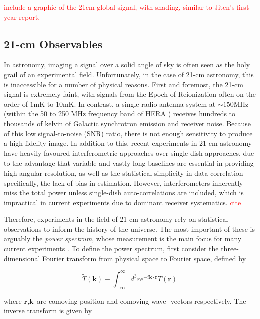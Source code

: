 \documentclass[floats,floatfix,showpacs,amssymb,prd,superscriptaddress,nofootinbib]{revtex4-2} %
\newcommand{\red}{\textcolor{red}}
\begin{document}
\red{include a graphic of the 21cm global signal, with shading, similar to Jiten's first year report.}

\subsection{21-cm Observables}

In astronomy, imaging a signal over a solid angle of sky is often seen as the holy grail of an experimental field. Unfortunately, in the case of 21-cm astronomy, this is inaccessible for a number of physical reasons. First and foremost, the 21-cm signal is extremely faint, with signals from the Epoch of Reionization often on the order of $1 \text{mK}$ to $10 \text{mK}$.
In contrast, a single radio-antenna system at  $\sim 150 \text{MHz}$ (within the 50 to 250 MHz frequency band of HERA \citep{DeBoer_2017}) receives hundreds to thousands of kelvin of Galactic synchrotron emission and receiver noise. Because of this low signal-to-noise (SNR) ratio, there is not enough sensitivity to produce a high-fidelity image. In addition to this, recent experiments in 21-cm astronomy have heavily favoured interferometric approaches over single-dish approaches, due to the advantage that variable and vastly long baselines are essential in providing high angular resolution, as well as the statistical simplicity in data correlation -- specifically, the lack of bias in estimation. However, interferometers inherently miss the total power unless single-dish auto-correlations are included, which is impractical in current experiments due to dominant receiver systematics. \red{cite}

Therefore, experiments in the field of 21-cm astronomy rely on statistical observations to inform the history of the universe. The most important of these is arguably the \textit{power spectrum}, whose measurement is the main focus for many current experiments \citep{DeBoer_2017}. To define the power spectrum, first consider the three-dimensional Fourier transform from physical space to Fourier space, defined by

\begin{equation}
    \tilde{T} (\textbf{k}) \equiv \int^\infty _{-\infty} d^3 r e^{-i\textbf{k} \cdot \textbf{r}} T(\textbf{r})
\end{equation}

\noindent where $\textbf{r}, \textbf{k}$ are comoving position and comoving wave- vectors respectively. The inverse transform is given by 
\end{document}
